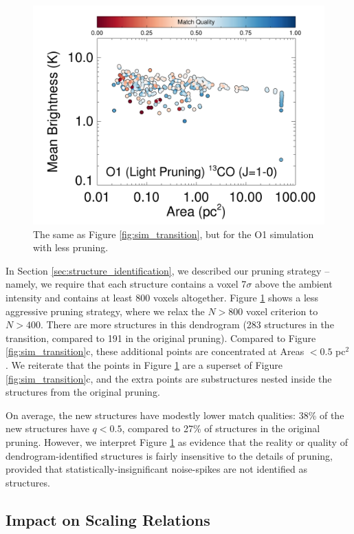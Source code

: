 \begin{figure}[htbp]
\centering
\includegraphics[width=5in]{figures/lightprune_dss_13co}
\caption{The same as Figure \ref{fig:sim_transition}, but for the O1 simulation with less pruning.}
\label{fig:sim_prune}
\end{figure}

In Section \ref{sec:structure_identification}, we described our pruning strategy -- namely, we require that each structure contains a voxel 7$\sigma$ above the ambient intensity and contains at least 800 voxels altogether. Figure \ref{fig:sim_prune} shows a less aggressive pruning strategy, where we relax the $N>800$ voxel criterion to $N>400$. There are more structures in this dendrogram (283 structures in the \coc\, transition, compared to 191 in the original pruning). Compared to Figure \ref{fig:sim_transition}c, these additional points are concentrated at Areas $< 0.5$ pc$^2$. We reiterate that the points in Figure \ref{fig:sim_prune} are a superset of Figure \ref{fig:sim_transition}c, and the extra points are substructures nested inside the structures
from the original pruning.

 On average, the new structures have modestly lower match qualities: 38\% of the new structures have $q<0.5$, compared to 27\% of structures in the original pruning. However, we interpret Figure \ref{fig:sim_prune} as evidence that the reality or quality of dendrogram-identified structures is fairly insensitive to the details of pruning, provided that statistically-insignificant noise-spikes are not identified as structures.

\subsection{Impact on Scaling Relations}

